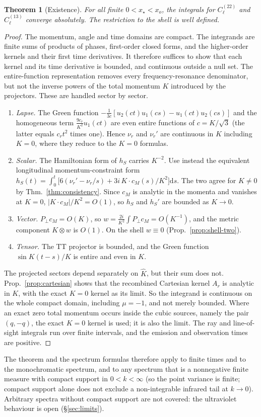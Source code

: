 \documentclass[11pt]{article}
\newtheorem{theorem}{Theorem}
\theoremstyle{definition}
\theoremstyle{remark}
\newcommand{\dd}{\mathrm{d}}
\begin{document}
\begin{theorem}[Existence]\label{thm:exist}
For all finite $0<x_\star<x_o$, the integrals for $C_\ell^{(22)}$ and $C_\ell^{(13)}$ converge
absolutely. The restriction to the shell is well defined.
\end{theorem}
\begin{proof}
The momentum, angle and time domains are compact. The integrands are finite sums of products
of phases, first-order closed forms, and the higher-order kernels and their first time
derivatives. It therefore suffices to show that each kernel and its time derivative is bounded,
and continuous outside a null set. The entire-function representation removes every
frequency-resonance denominator, but not the inverse powers of the total momentum $K$
introduced by the projectors. These are handled sector by sector.
\begin{enumerate}
\item \emph{Lapse.} The Green function
  $-\frac1{3c}[u_2(ct)u_1(cs)-u_1(ct)u_2(cs)]$ and the homogeneous term
  $\frac{9c_r}{K^2}u_1(ct)$ are even entire functions of $c=K/\sqrt3$ (the latter equals
  $c_rt^2$ times one). Hence $\nu_r$ and $\nu_r'$ are continuous in $K$ including $K=0$, where
  they reduce to the $K=0$ formulas.
\item \emph{Scalar.} The Hamiltonian form of $h_S$ carries $K^{-2}$. Use instead the
  equivalent longitudinal momentum-constraint form
  $h_S(t)=\int_0^t\big[6(\nu_r'-\nu_r/s)+3i\,K\!\cdot\!c_M(s)/K^2\big]\dd s$. The two agree for
  $K\neq0$ by Thm.~\ref{thm:consistency}. Since $c_M$ is analytic in the momenta and vanishes at
  $K=0$, $|K\cdot c_M|/K^2=O(1)$, so $h_S$ and $h_S'$ are bounded as $K\to0$.
\item \emph{Vector.} $P_\perp c_M=O(K)$, so $w=\frac{2i}{K^2}\int P_\perp c_M=O(K^{-1})$, and the
  metric component $K\otimes w$ is $O(1)$. On the shell $w\equiv0$
  (Prop.~\ref{prop:shell-two}).
\item \emph{Tensor.} The TT projector is bounded, and the Green function $\sin K(t-s)/K$ is
  entire and even in $K$.
\end{enumerate}
The projected sectors depend separately on $\hat K$, but their sum does not.
Prop.~\ref{prop:cartesian} shows that the recombined Cartesian kernel $A_r$ is analytic in $K$,
with the exact $K=0$ kernel as its limit. So the integrand is continuous on the whole compact
domain, including $\mu=-1$, and not merely bounded. Where an exact zero total momentum occurs
inside the cubic sources, namely the pair $(q,-q)$, the exact $K=0$ kernel is used; it is also
the limit. The ray and line-of-sight integrals run over finite
intervals, and the emission and observation times are positive.
\end{proof}
The theorem and the spectrum formulas therefore apply to finite times and to the
monochromatic spectrum, and to any spectrum that is a nonnegative finite measure with compact
support in $0<k<\infty$ (so the point variance is finite; compact support alone does not
exclude a non-integrable infrared tail at $k\to0$). Arbitrary spectra without compact
support are not covered: the ultraviolet behaviour is open (\S\ref{sec:limits}).
\end{document}

